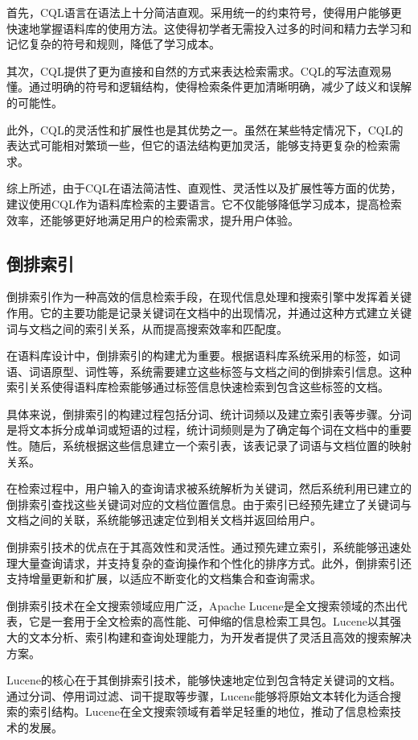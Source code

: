 \documentclass[11pt]{article}
\begin{document}
\begin{CJK*}{UTF8}{gbsn}
首先，CQL语言在语法上十分简洁直观。采用统一的约束符号，使得用户能够更快速地掌握语料库的使用方法。这使得初学者无需投入过多的时间和精力去学习和记忆复杂的符号和规则，降低了学习成本。

其次，CQL提供了更为直接和自然的方式来表达检索需求。CQL的写法直观易懂。通过明确的符号和逻辑结构，使得检索条件更加清晰明确，减少了歧义和误解的可能性。

此外，CQL的灵活性和扩展性也是其优势之一。虽然在某些特定情况下，CQL的表达式可能相对繁琐一些，但它的语法结构更加灵活，能够支持更复杂的检索需求。

综上所述，由于CQL在语法简洁性、直观性、灵活性以及扩展性等方面的优势，建议使用CQL作为语料库检索的主要语言。它不仅能够降低学习成本，提高检索效率，还能够更好地满足用户的检索需求，提升用户体验。

\subsection{倒排索引}

倒排索引作为一种高效的信息检索手段，在现代信息处理和搜索引擎中发挥着关键作用。它的主要功能是记录关键词在文档中的出现情况，并通过这种方式建立关键词与文档之间的索引关系，从而提高搜索效率和匹配度。

在语料库设计中，倒排索引的构建尤为重要。根据语料库系统采用的标签，如词语、词语原型、词性等，系统需要建立这些标签与文档之间的倒排索引信息。这种索引关系使得语料库检索能够通过标签信息快速检索到包含这些标签的文档。

具体来说，倒排索引的构建过程包括分词、统计词频以及建立索引表等步骤。分词是将文本拆分成单词或短语的过程，统计词频则是为了确定每个词在文档中的重要性。随后，系统根据这些信息建立一个索引表，该表记录了词语与文档位置的映射关系。

在检索过程中，用户输入的查询请求被系统解析为关键词，然后系统利用已建立的倒排索引查找这些关键词对应的文档位置信息。由于索引已经预先建立了关键词与文档之间的关联，系统能够迅速定位到相关文档并返回给用户。

倒排索引技术的优点在于其高效性和灵活性。通过预先建立索引，系统能够迅速处理大量查询请求，并支持复杂的查询操作和个性化的排序方式。此外，倒排索引还支持增量更新和扩展，以适应不断变化的文档集合和查询需求。

倒排索引技术在全文搜索领域应用广泛，Apache Lucene是全文搜索领域的杰出代表，它是一套用于全文检索的高性能、可伸缩的信息检索工具包。Lucene以其强大的文本分析、索引构建和查询处理能力，为开发者提供了灵活且高效的搜索解决方案。

Lucene的核心在于其倒排索引技术，能够快速地定位到包含特定关键词的文档。通过分词、停用词过滤、词干提取等步骤，Lucene能够将原始文本转化为适合搜索的索引结构。Lucene在全文搜索领域有着举足轻重的地位，推动了信息检索技术的发展。


\end{CJK*}
\end{document}
